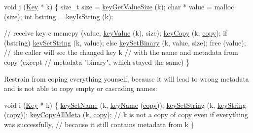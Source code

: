 \begin{DoxyCodeInclude}
\textcolor{keywordtype}{void} j (\hyperlink{classkdb_1_1Key_a5679f5cae63caddd64a60388b9cc77fa}{Key} * k)
\{
        \textcolor{keywordtype}{size\_t} size = \hyperlink{group__keyvalue_gae326672fffb7474abfe9baf53b73217e}{keyGetValueSize} (k);
        \textcolor{keywordtype}{char} * value = malloc (size);
        \textcolor{keywordtype}{int} bstring = \hyperlink{group__keytest_gaea7670778abd07fee0fe8ac12a149190}{keyIsString} (k);

        \textcolor{comment}{// receive key c}
        memcpy (value, \hyperlink{group__keyvalue_ga6f29609c5da53c6dc26a98678d5752af}{keyValue} (k), size);
        \hyperlink{group__key_ga6a12cbbe656a1ad9f41b8c681d7a2f92}{keyCopy} (k, \hyperlink{classkdb_1_1Key_ab5bc93e22f4cf40b9d2b1fc32cc260be}{copy});
        \textcolor{keywordflow}{if} (bstring)
                \hyperlink{group__keyvalue_ga622bde1eb0e0c4994728331326340ef2}{keySetString} (k, value);
        \textcolor{keywordflow}{else}
                \hyperlink{group__keyvalue_gaa50a5358fd328d373a45f395fa1b99e7}{keySetBinary} (k, value, size);
        free (value);
        \textcolor{comment}{// the caller will see the changed key k}
        \textcolor{comment}{// with the name and metadata from copy (except}
        \textcolor{comment}{// metadata "binary", which stayed the same)}
\}
\end{DoxyCodeInclude}
 Restrain from coping everything yourself, because it will lead to wrong metadata and is not able to copy empty or cascading names\+:


\begin{DoxyCodeInclude}
\textcolor{keywordtype}{void} i (\hyperlink{classkdb_1_1Key_a5679f5cae63caddd64a60388b9cc77fa}{Key} * k)
\{
        \hyperlink{group__keyname_ga7699091610e7f3f43d2949514a4b35d9}{keySetName} (k, \hyperlink{group__keyname_ga8e805c726a60da921d3736cda7813513}{keyName} (\hyperlink{classkdb_1_1Key_ab5bc93e22f4cf40b9d2b1fc32cc260be}{copy}));
        \hyperlink{group__keyvalue_ga622bde1eb0e0c4994728331326340ef2}{keySetString} (k, \hyperlink{group__keyvalue_ga880936f2481d28e6e2acbe7486a21d05}{keyString} (\hyperlink{classkdb_1_1Key_ab5bc93e22f4cf40b9d2b1fc32cc260be}{copy}));
        \hyperlink{group__keymeta_ga8e63720a65610a29597494d0671f9401}{keyCopyAllMeta} (k, \hyperlink{classkdb_1_1Key_ab5bc93e22f4cf40b9d2b1fc32cc260be}{copy});
        \textcolor{comment}{// k is not a copy of copy even if everything was successfully,}
        \textcolor{comment}{// because it still contains metadata from k}
\}
\end{DoxyCodeInclude}



